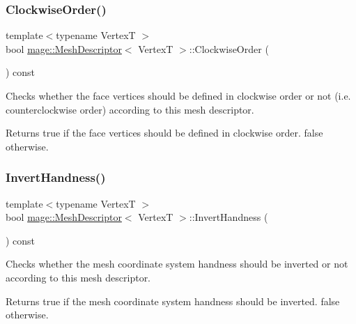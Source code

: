 \subsubsection{\texorpdfstring{Clockwise\+Order()}{ClockwiseOrder()}}
{\footnotesize\ttfamily template$<$typename VertexT $>$ \\
bool \hyperlink{structmage_1_1_mesh_descriptor}{mage\+::\+Mesh\+Descriptor}$<$ VertexT $>$\+::Clockwise\+Order (\begin{DoxyParamCaption}{ }\end{DoxyParamCaption}) const\hspace{0.3cm}{\ttfamily [noexcept]}}

Checks whether the face vertices should be defined in clockwise order or not (i.\+e. counterclockwise order) according to this mesh descriptor.

\begin{DoxyReturn}{Returns}
{\ttfamily true} if the face vertices should be defined in clockwise order. {\ttfamily false} otherwise. 
\end{DoxyReturn}
\hypertarget{structmage_1_1_mesh_descriptor_ad16f81c7c37875e3eba4a6c0dd0613fb}{}\label{structmage_1_1_mesh_descriptor_ad16f81c7c37875e3eba4a6c0dd0613fb} 
\subsubsection{\texorpdfstring{Invert\+Handness()}{InvertHandness()}}
{\footnotesize\ttfamily template$<$typename VertexT $>$ \\
bool \hyperlink{structmage_1_1_mesh_descriptor}{mage\+::\+Mesh\+Descriptor}$<$ VertexT $>$\+::Invert\+Handness (\begin{DoxyParamCaption}{ }\end{DoxyParamCaption}) const\hspace{0.3cm}{\ttfamily [noexcept]}}

Checks whether the mesh coordinate system handness should be inverted or not according to this mesh descriptor.

\begin{DoxyReturn}{Returns}
{\ttfamily true} if the mesh coordinate system handness should be inverted. {\ttfamily false} otherwise. 
\end{DoxyReturn}
\hypertarget{structmage_1_1_mesh_descriptor_aef6a9568a8d4516dbeff4d8f665ca213}{}\label{structmage_1_1_mesh_descriptor_aef6a9568a8d4516dbeff4d8f665ca213} 
